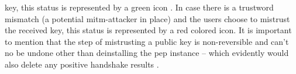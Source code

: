 key, this status is represented by a green icon \cite{15}. In case there is a trustword mismatch (a potential \acrshort{mitm}-attacker in place) and the users choose to mistrust the received key, this status is represented by a red colored icon. It is important to mention that the step of mistrusting a public
key is non-reversible and can't no be undone other than deinstalling the \acrshort{pep} instance -- which evidently would also delete any positive handshake results \cite{18}.